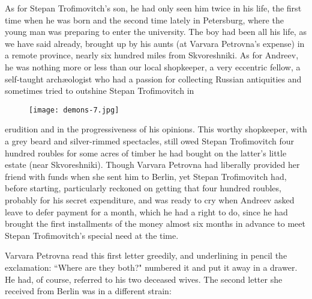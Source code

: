 \documentclass[12pt]{article}
\begin{document}
\vspace{12pt}
As for Stepan Trofimovitch's son, he had only seen him twice in his
life, the first time when he was born and the second time lately in
Petersburg, where the young man was preparing to enter the university.
The boy had been all his life, as we have said already, brought up by
his aunts (at Varvara Petrovna's expense) in a remote province, nearly
six hundred miles from Skvoreshniki. As for Andreev, he was nothing
more or less than our local shopkeeper, a very eccentric fellow, a
self-taught archæologist who had a passion for collecting Russian
antiquities and sometimes tried to outshine Stepan Trofimovitch in
\begin{figure}[!ht]
\begin{center}
\texttt{[image: demons-7.jpg]}
\end{center}
\end{figure}
erudition and in the progressiveness of his opinions. This worthy
shopkeeper, with a grey beard and silver-rimmed spectacles, still owed
Stepan Trofimovitch four hundred roubles for some acres of timber he had
bought on the latter's little estate (near Skvoreshniki). Though Varvara
Petrovna had liberally provided her friend with funds when she sent him
to Berlin, yet Stepan Trofimovitch had, before starting, particularly
reckoned on getting that four hundred roubles, probably for his secret
expenditure, and was ready to cry when Andreev asked leave to defer
payment for a month, which he had a right to do, since he had brought
the first installments of the money almost six months in advance to meet
Stepan Trofimovitch's special need at the time.


\vspace{12pt}
Varvara Petrovna read this first letter greedily, and underlining in
pencil the exclamation: ``Where are they both?" numbered it and put it
away in a drawer. He had, of course, referred to his two deceased wives.
The second letter she received from Berlin was in a different strain:
\end{document}
